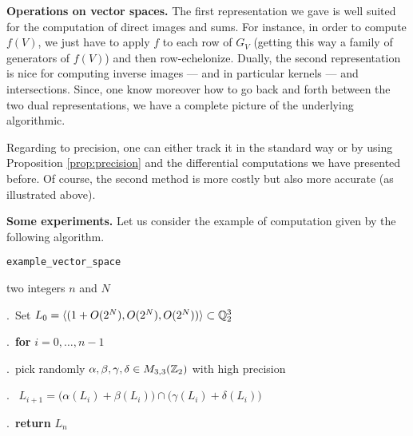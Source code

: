 \documentclass{sig-alternate}
\begin{document}
\medskip

\noindent
{\bf Operations on vector spaces.}
The first representation we gave is well suited for the computation
of direct images and sums. For instance, in order to compute $f(V)$, 
we just have to apply $f$ to each row of $G_V$ (getting this way a
family of generators of $f(V)$) and then row-echelonize. Dually, the
second representation is nice for computing inverse images --- and 
in particular kernels --- and intersections. Since, one know moreover
how to go back and forth between the two dual representations, we have 
a complete picture of the underlying algorithmic.

Regarding to precision, one can either track it in the standard way or 
by using Proposition \ref{prop:precision} and the differential 
computations we have presented before. Of course, the second method 
is more costly but also more accurate (as illustrated above).

\medskip

\noindent
{\bf Some experiments.}
Let us consider the example of computation given by the following
algorithm.

\noindent\hrulefill

 {\tt example\_vector\_space}

 two integers $n$ and $N$

\smallskip

.\ Set $L_0 = \langle (1 + O(2^N),  O(2^N), O(2^N)) \rangle
\subset \mathbb Q_2^3$

.\ {\bf for} $i=0,\dots,n-1$

.\ \hspace{0.3cm}pick randomly $\alpha, \beta, \gamma, \delta
\in M_{3,3}(\mathbb Z_2)$ with high precision

.\ \hspace{0.3cm}{\bf compute} $L_{i+1} = 
\big(\alpha(L_i) + \beta(L_i)\big) \cap \big(\gamma(L_i) + \delta(L_i)\big)$

.\ {\bf return} $L_n$

\vspace{-1ex}\noindent\hrulefill

\medskip
\end{document}
